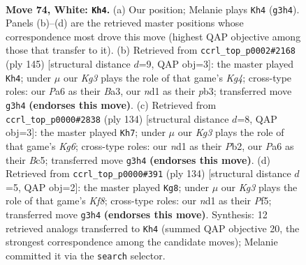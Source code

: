 \documentclass[11pt]{article}
\begin{document}
\clearpage

\begin{figure}[p]\centering
\begin{subfigure}{0.46\textwidth}\centering
\resizebox{\linewidth}{!}{%
\newchessgame
\chessboard[
  setfen={6k1/8/P3b3/1P6/8/6K1/8/3n4 w - - 1 74},
  showmover=false,
  pgfstyle=straightmove, color=movearrow, markmove={g3-h4}
]}
\caption{}
\end{subfigure}\hfill
\begin{subfigure}{0.46\textwidth}\centering
\resizebox{\linewidth}{!}{%
\newchessgame
\chessboard[
  setfen={8/8/8/6k1/1p6/bP5B/8/5K2 b - - 9 73},
  showmover=false,
  pgfstyle=straightmove, color=movearrow, markmove={g5-h4}
]}
\caption{}
\end{subfigure}
\\[4pt]
\begin{subfigure}{0.46\textwidth}\centering
\resizebox{\linewidth}{!}{%
\newchessgame
\chessboard[
  setfen={8/8/4k1K1/1pB5/6b1/8/1P6/8 w - - 0 68},
  showmover=false,
  pgfstyle=straightmove, color=movearrow, markmove={g6-h7}
]}
\caption{}
\end{subfigure}\hfill
\begin{subfigure}{0.46\textwidth}\centering
\resizebox{\linewidth}{!}{%
\newchessgame
\chessboard[
  setfen={5K2/8/5b1p/5P1P/8/2k5/8/8 w - - 13 68},
  showmover=false,
  pgfstyle=straightmove, color=movearrow, markmove={f8-g8}
]}
\caption{}
\end{subfigure}
\caption{\textbf{Move 74, White: \texttt{Kh4}.} (a) Our position; Melanie plays \texttt{Kh4} (\texttt{g3h4}). Panels (b)--(d) are the retrieved master positions whose correspondence most drove this move (highest QAP objective among those that transfer to it). (b) Retrieved from \texttt{ccrl\_top\_p0002\#2168} (ply 145) [structural distance $d$=9, QAP obj=3]: the master played \texttt{Kh4}; under $\mu$ our \emph{Kg3} plays the role of that game's \emph{Kg4}; cross-type roles: our \emph{P}a6 as their \emph{B}a3, our \emph{n}d1 as their \emph{p}b3; transferred move \texttt{g3h4} \textbf{(endorses this move)}. (c) Retrieved from \texttt{ccrl\_top\_p0000\#2838} (ply 134) [structural distance $d$=8, QAP obj=3]: the master played \texttt{Kh7}; under $\mu$ our \emph{Kg3} plays the role of that game's \emph{Kg6}; cross-type roles: our \emph{n}d1 as their \emph{P}b2, our \emph{P}a6 as their \emph{B}c5; transferred move \texttt{g3h4} \textbf{(endorses this move)}. (d) Retrieved from \texttt{ccrl\_top\_p0000\#391} (ply 134) [structural distance $d$=5, QAP obj=2]: the master played \texttt{Kg8}; under $\mu$ our \emph{Kg3} plays the role of that game's \emph{Kf8}; cross-type roles: our \emph{n}d1 as their \emph{P}f5; transferred move \texttt{g3h4} \textbf{(endorses this move)}. Synthesis: 12 retrieved analogs transferred to \texttt{Kh4} (summed QAP objective 20, the strongest correspondence among the candidate moves); Melanie committed it via the \texttt{search} selector.}
\label{fig:thought-m146}
\end{figure}
\end{document}

